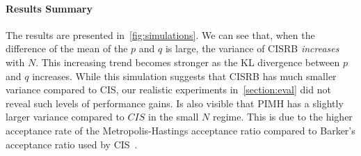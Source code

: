 \paragraph{Results Summary}
The results are presented in~\cref{fig:simulations}.
We can see that, when the difference of the mean of the \(p\) and \(q\) is large, the variance of CISRB \textit{increases} with \(N\).
This increasing trend becomes stronger as the KL divergence between \(p\) and \(q\) increases.
While this simulation suggests that CISRB has much smaller variance compared to CIS, our realistic experiments in~\cref{section:eval} did not reveal such levels of performance gains.
Is also visible that PIMH has a slightly larger variance compared to \(CIS\) in the small \(N\) regime.
This is due to the higher acceptance rate of the Metropolis-Hastings acceptance ratio compared to Barker's acceptance ratio used by CIS~\citep{peskun_optimum_1973, minh_understanding_2015}.

